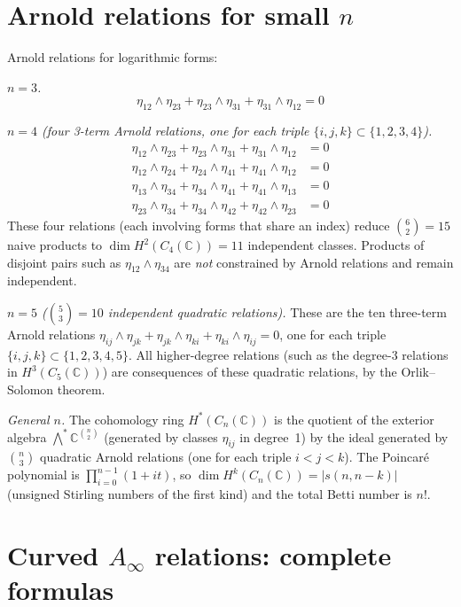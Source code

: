 \chapter{\texorpdfstring{Arnold relations for small $n$}{Arnold relations for small n}}
 
Arnold relations for logarithmic forms:
 
\emph{$n = 3$.}
\[
\eta_{12} \wedge \eta_{23} + \eta_{23} \wedge \eta_{31} + \eta_{31} \wedge \eta_{12} = 0
\]

\emph{$n = 4$ (four 3-term Arnold relations, one for each triple $\{i,j,k\} \subset \{1,2,3,4\}$).}
\begin{align*}
\eta_{12} \wedge \eta_{23} + \eta_{23} \wedge \eta_{31} + \eta_{31} \wedge \eta_{12} &= 0 \\
\eta_{12} \wedge \eta_{24} + \eta_{24} \wedge \eta_{41} + \eta_{41} \wedge \eta_{12} &= 0 \\
\eta_{13} \wedge \eta_{34} + \eta_{34} \wedge \eta_{41} + \eta_{41} \wedge \eta_{13} &= 0 \\
\eta_{23} \wedge \eta_{34} + \eta_{34} \wedge \eta_{42} + \eta_{42} \wedge \eta_{23} &= 0
\end{align*}
These four relations (each involving forms that share an index) reduce $\binom{6}{2} = 15$ naive products to $\dim H^2(C_4(\mathbb{C})) = 11$ independent classes.  Products of disjoint pairs such as $\eta_{12} \wedge \eta_{34}$ are \emph{not} constrained by Arnold relations and remain independent.
 
\emph{$n = 5$ ($\binom{5}{3} = 10$ independent quadratic relations).}
These are the ten three-term Arnold relations $\eta_{ij} \wedge \eta_{jk} + \eta_{jk} \wedge \eta_{ki} + \eta_{ki} \wedge \eta_{ij} = 0$, one for each triple $\{i,j,k\} \subset \{1,2,3,4,5\}$.  All higher-degree relations (such as the degree-3 relations in $H^3(C_5(\mathbb{C}))$) are consequences of these quadratic relations, by the Orlik--Solomon theorem.
 
\emph{General $n$.} The cohomology ring $H^*(C_n(\mathbb{C}))$ is the quotient of the
exterior algebra $\bigwedge^* \mathbb{C}^{\binom{n}{2}}$ (generated by classes $\eta_{ij}$ in degree~1)
by the ideal generated by $\binom{n}{3}$ quadratic Arnold relations (one for each triple $i < j < k$).
The Poincar\'{e} polynomial is $\prod_{i=0}^{n-1}(1 + it)$, so
$\dim H^k(C_n(\mathbb{C})) = |s(n, n-k)|$ (unsigned Stirling numbers of the first kind)
and the total Betti number is $n!$.


\chapter{\texorpdfstring{Curved $A_\infty$ relations: complete formulas}{Curved A infty relations: complete formulas}}
\label{app:curved-ainfty-formulas}

